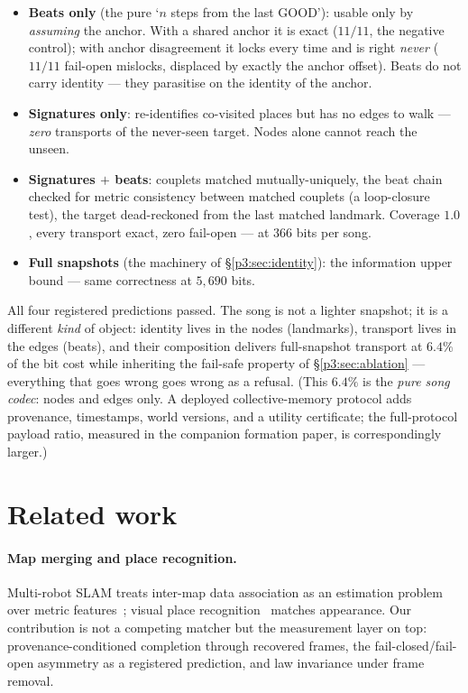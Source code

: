 \documentclass{article}
\begin{document}
\begin{itemize}[leftmargin=16pt,itemsep=2pt,topsep=2pt]
\item \textbf{Beats only} (the pure `$n$ steps from the last GOOD'):
  usable only by \emph{assuming} the anchor. With a shared anchor it
  is exact ($11/11$, the negative control); with anchor disagreement
  it locks every time and is right \emph{never} ($11/11$ fail-open
  mislocks, displaced by exactly the anchor offset). Beats do not
  carry identity --- they parasitise on the identity of the anchor.
\item \textbf{Signatures only}: re-identifies co-visited places but
  has no edges to walk --- \emph{zero} transports of the never-seen
  target. Nodes alone cannot reach the unseen.
\item \textbf{Signatures $+$ beats}: couplets matched mutually-uniquely,
  the beat chain checked for metric consistency between matched
  couplets (a loop-closure test), the target dead-reckoned from the
  last matched landmark. Coverage $1.0$, every transport exact, zero
  fail-open --- at $366$ bits per song.
\item \textbf{Full snapshots} (the machinery of
  \S\ref{p3:sec:identity}): the information upper bound --- same
  correctness at $5{,}690$ bits.
\end{itemize}

All four registered predictions passed. The song is not a lighter
snapshot; it is a different \emph{kind} of object: identity lives in
the nodes (landmarks), transport lives in the edges (beats), and
their composition delivers full-snapshot transport at $6.4\%$ of the
bit cost while inheriting the fail-safe property of
\S\ref{p3:sec:ablation} --- everything that goes wrong goes wrong as a
refusal. (This $6.4\%$ is the \emph{pure song codec}: nodes and
edges only. A deployed collective-memory protocol adds provenance,
timestamps, world versions, and a utility certificate; the
full-protocol payload ratio, measured in the companion formation
paper, is correspondingly larger.)

\section{Related work}
\label{p3:sec:related}

\paragraph{Map merging and place recognition.} Multi-robot SLAM
treats inter-map data association as an estimation problem over
metric features~\cite{cadena2016slam}; visual place
recognition~\cite{lowry2016vpr} matches appearance. Our contribution
is not a competing matcher but the measurement layer on top:
provenance-conditioned completion through recovered frames, the
fail-closed/fail-open asymmetry as a registered prediction, and law
invariance under frame removal.
\end{document}
